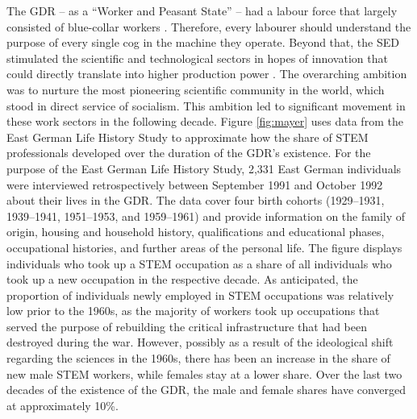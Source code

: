 \documentclass[a4paper, oneside, hyperfootnotes = false]{article}
\begin{document}
{%
The GDR -- as a ``Worker and Peasant State'' -- had a labour force that largely consisted of blue-collar workers \citep{DDRJahrbuch1957}.
Therefore, every labourer should understand the purpose of every single cog in the machine they operate.
Beyond that, the SED stimulated the scientific and technological sectors in hopes of innovation that could directly translate into higher production power \citep{Hoegselius2009}.
The overarching ambition was to nurture the most pioneering scientific community in the world, which stood in direct service of socialism.
This ambition led to significant movement in these work sectors in the following decade.
Figure \ref{fig:mayer} uses data from the East German Life History Study to approximate how the share of STEM professionals developed over the duration of the GDR's existence.
For the purpose of the East German Life History Study, 2,331 East German individuals were interviewed retrospectively between September 1991 and October 1992 about their lives in the GDR.
The data cover four birth cohorts (1929--1931, 1939--1941, 1951--1953, and 1959--1961) and provide information on the family of origin, housing and household history, qualifications and educational phases, occupational histories, and further areas of the personal life.
The figure displays individuals who took up a STEM occupation as a share of all individuals who took up a new occupation in the respective decade.
As anticipated, the proportion of individuals newly employed in STEM occupations was relatively low prior to the 1960s, as the majority of workers took up occupations that served the purpose of rebuilding the critical infrastructure that had been destroyed during the war.
However, possibly as a result of the ideological shift regarding the sciences in the 1960s, there has been an increase in the share of new male STEM workers, while females stay at a lower share.
Over the last two decades of the existence of the GDR, the male and female shares have converged at approximately 10\%.

}
\end{document}
